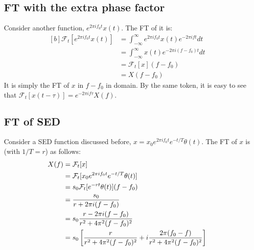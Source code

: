 \documentclass[letterpaper, 11pt]{article}
\newcommand{\fint}{\int_{-\infty}^{\infty}} %
\newcommand{\sed}[2]{#2_{0}e^{2\pi if_{0}#1}e^{-#1/T} \theta (#1)} %
\newcommand{\fourier}[2]{\mathcal{F}_{#1}[#2]} %
\newcommand{\ft}[3]{\fint #2 e^{-2\pi i#3#1} d#1} %
\numberwithin{equation}{section}
\numberwithin{figure}{section}
\numberwithin{table}{section}
\begin{document}
\subsection{FT with the extra phase factor}
Consider another function, \(e^{2\pi i f_{0} t}x(t)\). The FT of it is:
\begin{equation}
	\begin{aligned}[b]
		\fourier{t}{e^{2\pi i f_{0} t}x(t)}
			&= \ft{t}{e^{2\pi i f_{0} t}x(t)}{f}\\
			&= \ft{t}{x(t)}{(f - f_{0})}\\
			&= \fourier{t}{x}(f - f_{0})\\
			&= X(f - f_{0})
	\end{aligned}
\end{equation}
It is simply the FT of \(x\) in \(f - f_{0}\) in domain. By the same token, it is easy to see that \(\fourier{t}{x(t - \tau)} = e^{-2\pi i f\tau}X(f)\).

\subsection{FT of SED}
Consider a SED function discussed before, \(x = \sed{t}{x}\). The FT of \(x\) is (with \(1/T = r\)) as follows:
\begin{equation}
	\begin{aligned}[b]
		X(f)	&= \fourier{t}{x}\\
			&= \fourier{t}{\sed{t}{x}}\\
			&= s_{0}\fourier{t}{e^{-rt} \theta (t)}(f - f_{0})\\
			&= \frac{s_{0}}{r + 2\pi i(f - f_{0})} \\
			\gdef\temp{r^2 + 4\pi^{2}(f - f_{0})^2} %
			&= s_{0}\frac{r - 2\pi i(f - f_{0})}{\temp}\\
			&= s_{0}\left[\frac{r}{\temp} + i\frac{2\pi(f_{0} - f)}{\temp} \right]
	\end{aligned}
\end{equation}

\end{document}
